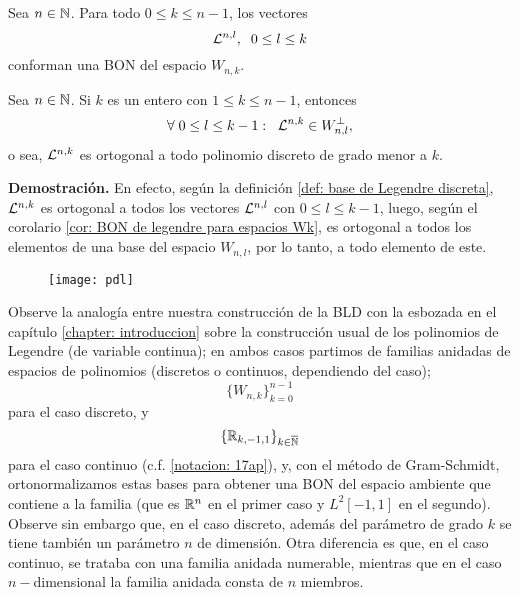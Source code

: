 \begin{cor} \label{cor: BON de legendre para espacios Wk}
Sea $n \in \mathbb{N}$. Para todo $0 \leq k \leq n-1$, los vectores
\[
\mathcal{L}^{n, l}, \hspace{0.2cm} 0 \leq l \leq k
\]
conforman una BON del espacio $W_{n,k}$.
\end{cor}

\begin{cor} \label{cor: Ln,k ortogonal a todo pol discreto de grado menor a k}
Sea $n \in \mathbb{N}$. Si $k$ es un entero con $1 \leq k \leq n-1$,
entonces
\[
\forall \hspace{0.1cm} 0 \leq l \leq k-1:
\hspace{0.2cm}
\mathcal{L}^{n,k} \in W_{n,l}^{\perp},
\]
o sea, 
$\mathcal{L}^{n,k}$ es ortogonal a todo polinomio discreto
de grado menor a $k$.
\end{cor}
\noindent
\textbf{Demostración.}
En efecto, según la definición
\ref{def: base de Legendre discreta}, 
$\mathcal{L}^{n,k}$ es ortogonal a todos los vectores
$\mathcal{L}^{n, l}$ con $0 \leq l \leq k-1$,
luego, según el corolario
\ref{cor: BON de legendre para espacios Wk},
es
ortogonal a todos los elementos
de una base del espacio $W_{n,l}$,
por lo tanto, a todo elemento de este.
\QEDB
\vspace{0.2cm}



\begin{figure}[H]
	\centering
	\texttt{[image: pdl]} 
\end{figure}	


\begin{nota}
Observe la analogía entre nuestra construcción de la BLD
con la esbozada en el capítulo 
\ref{chapter: introduccion} sobre la construcción 
usual de los polinomios
de Legendre (de variable continua);
en ambos casos partimos de familias anidadas de espacios 
de polinomios
(discretos o continuos, dependiendo del caso);
	\[
	\{ W_{n,k} \}_{k=0}^{n-1} 
	\]
para el caso discreto, y
	\[
	\{ \mathbb{R}_{k,-1,1} \}_{k \in \overline{\mathbb{N}}}
	\]	
para el caso continuo (c.f. \ref{notacion: 17ap}),
y, con el 
método de Gram-Schmidt, ortonormalizamos estas bases para obtener
una BON del espacio ambiente que contiene a la familia
(que es $\mathbb{R}^{n}$ en el primer caso y $L^{2}[-1,1]$
en el segundo). \\

Observe sin embargo que, en el caso discreto, además
del parámetro de grado $k$ se tiene también un parámetro
$n$ de dimensión. Otra diferencia es que, en el caso 
continuo, se trataba con una familia anidada numerable, mientras
que en el caso $n-$dimensional la familia anidada consta
de $n$ miembros.
\end{nota}


